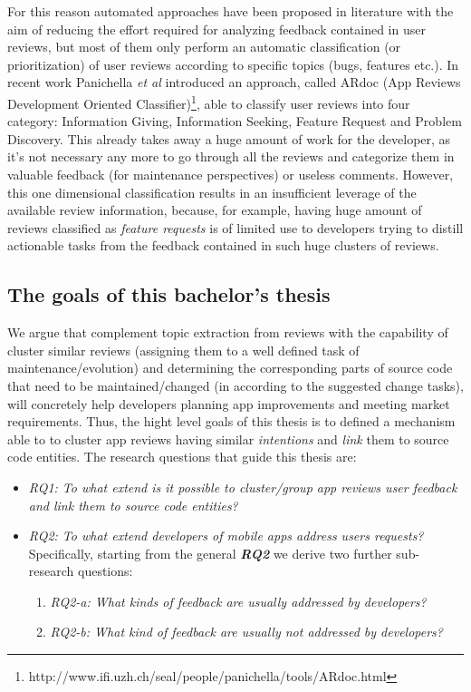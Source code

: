 \documentclass{task_description}
\begin{document}
For this reason automated approaches have been proposed in literature with the aim of reducing the effort required for analyzing feedback contained in user reviews\cite{Ha2013, Oh2013,IacobMSR2013, Iacob2014,GalvisCarrenoICSE2013,GuzmanRE2014,MaalejRE2015,ChenICSE2014,Fu2013,Vu2015,PalombaICSME2015,Gu2015}, but most of them only perform an automatic classification (or prioritization) of user reviews according to specific topics (\eg bugs, features etc.).
In recent work Panichella {\em et al}\cite{PanichellaICSME2015}  introduced an approach, called ARdoc (App Reviews Development Oriented Classifier)\footnote{http://www.ifi.uzh.ch/seal/people/panichella/tools/ARdoc.html}, able to classify user reviews into four category: Information Giving, Information Seeking, Feature Request and Problem Discovery.
This already takes away a huge amount of work for the developer, as it's not necessary any more to go through all the reviews and categorize them in valuable feedback (for maintenance perspectives) or useless comments.
However, this one dimensional classification results in an insufficient leverage of the available review information, because, for example, having huge amount of reviews classified as \textit{feature requests} is of limited use to developers trying to distill actionable tasks from the feedback contained in such huge clusters of reviews.

\newpage

\subsection*{The goals of this bachelor's thesis}
We argue that complement topic extraction from reviews with the capability of cluster similar reviews (assigning them to a well defined task of maintenance/evolution) and
  determining the corresponding parts of source code that need to be maintained/changed (in according to the suggested change tasks),  will concretely help developers planning app improvements and meeting market requirements.
%
Thus, the hight level goals of this thesis is to defined a mechanism able to to cluster app reviews having similar \textit{intentions} and \textit{link} them to source code entities. 
The research questions that guide this thesis are: 

\begin{itemize}
\item \textit{RQ1: To what extend is it possible to cluster/group app reviews user feedback
   and link them to source code entities?}
\item \textit{RQ2: To what extend developers of mobile apps address users requests?}
         Specifically, starting from the general \textbf{\textit{RQ2}} we derive two further sub-research questions:
         \begin{enumerate}
	\item \textit{RQ2-a: What kinds of feedback are usually  addressed by developers?}
	\item \textit{RQ2-b: What kind of feedback are usually not addressed by developers?} 
	\end{enumerate}
\end{itemize}      
      
\end{document}
